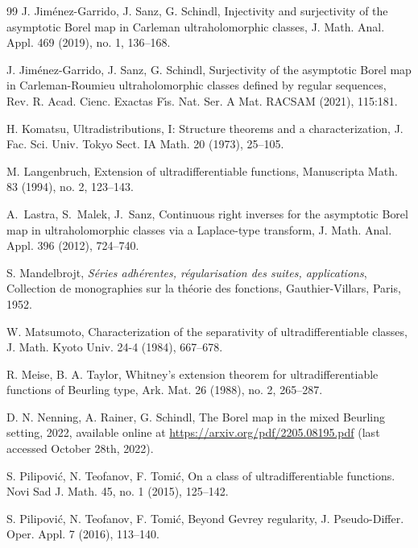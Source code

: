 \documentclass[11pt,a4paper]{article}
\theoremstyle{plain}
\theoremstyle{definition}
\begin{document}
\begin{thebibliography}{99}
 J. Jim\'enez-Garrido, J. Sanz, G. Schindl, Injectivity and surjectivity of the asymptotic Borel map in Carleman ultraholomorphic classes, J. Math. Anal. Appl. 469 (2019), no. 1, 136--168.

 J. Jim\'enez-Garrido, J. Sanz, G. Schindl, Surjectivity of the asymptotic Borel map in Carleman-Roumieu ultraholomorphic classes defined by regular sequences, Rev. R. Acad. Cienc. Exactas F{\'\i}s. Nat. Ser. A Mat. RACSAM (2021), 115:181.

 H. Komatsu, Ultradistributions, I: Structure theorems and a characterization, J. Fac. Sci. Univ. Tokyo Sect. IA Math.  20 (1973), 25--105.

 M. Langenbruch, Extension of ultradifferentiable functions, Manuscripta Math. 83 (1994), no. 2, 123--143.

A.~Lastra, S.~Malek, J.~Sanz,
\newblock Continuous right inverses for the asymptotic {B}orel map in
  ultraholomorphic classes via a {L}aplace-type transform,
\newblock J. Math. Anal. Appl. 396 (2012), 724--740.

 S. Mandelbrojt, \textit{S\'eries adh\'erentes, r\'egularisation des suites, applications}, Collection de monographies sur la th\'eorie des fonctions, Gauthier-Villars, Paris, 1952.

 W. Matsumoto, Characterization of the separativity of ultradifferentiable classes, J. Math. Kyoto Univ. 24-4 (1984),  667--678.

 R. Meise, B. A. Taylor, Whitney's extension theorem for ultradifferentiable functions of {B}eurling type, Ark. Mat. 26 (1988), no. 2, 265--287.

  D. N. Nenning, A. Rainer, G. Schindl, The Borel map in the mixed Beurling setting, 2022, available online at \href{https://arxiv.org/pdf/2205.08195.pdf}{https://arxiv.org/pdf/2205.08195.pdf} (last accessed October 28th, 2022).

 S. Pilipovi{\'c}, N. Teofanov, F. Tomi{\'c}, On a class of ultradifferentiable functions. Novi Sad J. Math. 45, no. 1  (2015), 125--142.

 S. Pilipovi{\'c}, N. Teofanov, F. Tomi{\'c}, Beyond Gevrey regularity, J. Pseudo-Differ. Oper. Appl. 7 (2016), 113--140.


\end{thebibliography}
\end{document}
